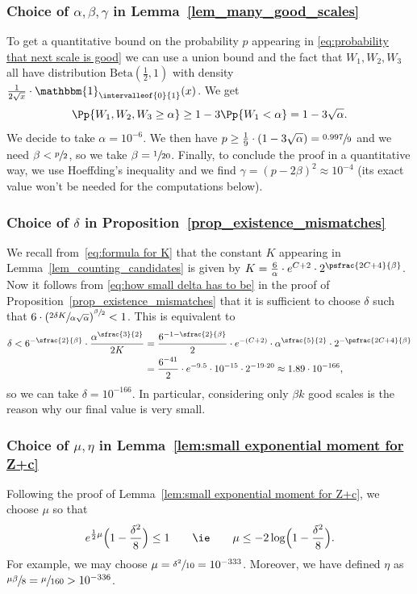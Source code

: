 \subsubsection*{Choice of $\alpha,\beta,\gamma$ in Lemma~\ref{lem_many_good_scales}}
To get a quantitative bound on the probability $p$ appearing in \eqref{eq:probability that next scale is good} we can use a union bound and the fact that $W_1, W_2,W_3$ all have distribution $\mathrm{Beta}(\frac{1}{2},1)$ with density $\frac{1}{2\sqrt{x}}\cdot \mathbbm{1}_{\intervalleof{0}{1}}(x)$. We get
\begin{align*}
\Pp{W_1, W_2,W_3 \geq \alpha} \geq 1 - 3 \Pp{W_1 <\alpha} = 1 - 3\sqrt{\alpha}.
\end{align*}
We decide to take $\alpha = 10^{-6}$. We then have $p\geq \frac{1}{9}\cdot (1 - 3\sqrt{\alpha})=\sfrac{0.997}{9}$ and we need $\beta< \sfrac{p}{2}$, so we take $\beta=\sfrac{1}{20}$.
Finally, to conclude the proof in a quantitative way, we use Hoeffding's inequality and we find $\gamma=(p-2\beta)^2 \approx 10^{-4}$ (its exact value won't be needed for the computations below).

\subsubsection*{Choice of $\delta$ in Proposition~\ref{prop_existence_mismatches}}
We recall from~\eqref{eq:formula for K} that the constant $K$ appearing in Lemma~\ref{lem_counting_candidates} is
given by $K=\frac{6}{\alpha} \cdot e^{C+2} \cdot 2^{\psfrac{2C+4}{\beta}}$.
Now it follows from \eqref{eq:how small delta has to be} in the proof of Proposition~\ref{prop_existence_mismatches} that it is sufficient to choose $\delta$ such that
$6 \cdot \left( \sfrac{2\delta K}{\alpha\sqrt{\alpha}} \right)^{\sfrac{\beta}{2}}<1$.
This is equivalent to
\begin{align*}
\delta < 6^{-\sfrac{2}{\beta}}\cdot\frac{\alpha^{\sfrac{3}{2}}}{2 K}&= \frac{6^{-1-\sfrac{2}{\beta}}}{2}\cdot e^{-(C+2)}\cdot \alpha^{\sfrac{5}{2}} \cdot 2^{-\psfrac{2C+4}{\beta}}
\\&= \frac{6^{-41}}{2} \cdot e^{-9.5}\cdot 10^{-15} \cdot 2^{-19\cdot 20} \approx 1.89 \cdot 10^{-166},
\end{align*}
so we can take $\delta = 10^{-166}$. In particular, considering only $\beta k$ good scales is the reason why our final value is very small.

\subsubsection*{Choice of $\mu, \eta$ in Lemma~\ref{lem:small exponential moment for Z+c}}
Following the proof of Lemma~\ref{lem:small exponential moment for Z+c}, we choose $\mu$ so that
\begin{align*}
e^{\frac12 \mu} \Bigl( 1-\frac{\delta^2}{8} \Bigr) \leq 1 \qquad \text{\ie} \qquad \mu \leq -2 \log \Bigl( 1-\frac{\delta^2}{8} \Bigl).
\end{align*}
For example, we may choose $\mu = \sfrac{\delta^2}{10}=10^{-333}$. Moreover, we have defined $\eta$ as $\sfrac{\mu \beta}{8}=\sfrac{\mu}{160}>10^{-336}$.
